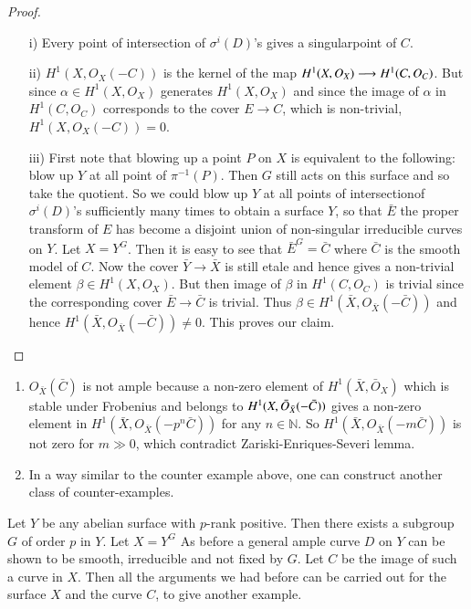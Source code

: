 \begin{proof}
\begin{itemize}
\item [i)] Every point of intersection of $\sigma^i(D)$'s gives a
  singular\break point of $C$.

\item [ii)] $H^1(X,O_X(-C))$ is the kernel of the map $H^1(X,O_X)
  \longrightarrow H^1(C,\break O_C)$. But since $\alpha\in H^1(X,O_X)$
  generates $H^1(X,O_X)$ and since the image of $\alpha$ in
  $H^1(C,O_C)$ corresponds to the cover $E\longrightarrow C$, which is
  non-trivial, $H^1(X,O_X(-C))=0$. 

\item [iii)] First note that blowing up a point $P$ on $X$ is
  equivalent to the following: blow up $Y$ at all point of
  $\pi^{-1}(P)$. Then $G$ still acts on this surface and so take the
  quotient. So we could blow up $Y$ at all points of
  intersection\pageoriginale of $\sigma^i(D)$'s sufficiently many
  times to obtain a surface $Y$, so that $\bar{E}$ the proper
  transform of $E$ has become a disjoint union of non-singular
  irreducible curves on $Y$. Let $X=Y^G$. Then it is easy to see that
  $\bar{E}^G=\bar{C}$ where $\bar{C}$ is the smooth model of $C$. Now
  the cover $\bar{Y}\longrightarrow\bar{X}$ is still etale and hence
  gives a non-trivial element $\beta\in H^1(X,O_X)$. But then image of
  $\beta$ in $H^1(C,O_C)$ is trivial since the corresponding cover
  $\bar{E}\longrightarrow\bar{C}$ is trivial. Thus $\beta\in H^1
  (\bar{X}, O_{\bar{X}}(-\bar{C}))$ and hence $H^1(\bar{X},O_{\bar{X}}
  (-\bar{C}))\neq 0$. This proves our claim.
\end{itemize}
\end{proof}

\begin{REM*}
\begin{enumerate}
\item $O_{\bar{X}}(\bar{C})$ is not ample because a non-zero element
  of $H^1 (\bar{X},\bar{O}_X)$ which is stable under Frobenius and
  belongs to $H^1(X,\break\bar{O}_{\bar{X}}(-\bar{C}))$ gives a non-zero
  element in $H^1(\bar{X},O_{\bar{X}}(-p^n\bar{C}))$ for any
  $n\in\mathbb{N}$. So $H^1(\bar{X},O_{\bar{X}}(-m\bar{C}))$ is not
  zero for $m\gg 0$, which contradict Zariski-Enriques-Severi lemma.
\item In a way similar to the counter example above, one can construct
  another class of counter-examples.
\end{enumerate}
\end{REM*}

Let $Y$ be any abelian surface with $p$-rank positive. Then there
exists a subgroup $G$ of order $p$ in $Y$. Let $X=Y^G$ As before a
general ample curve $D$ on $Y$ can be shown to be smooth, irreducible
and not fixed by $G$. Let $C$ be the image of such a curve in
$X$. Then all the arguments we had before can be carried out for the
surface $X$ and the curve $C$, to give another example. 

